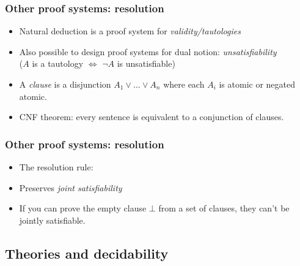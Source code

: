 \begin{frame}
  \frametitle{Other proof systems: resolution}

  \begin{itemize}
\item Natural deduction is a proof system for \emph{validity/tautologies}
\item Also possible to design proof systems for dual notion: \emph{unsatisfiability}\\
($A$ is a tautology $\Leftrightarrow$ $\lnot A$ is unsatisfiable)
\item A \emph{clause} is a disjunction $ A_1 \lor \ldots \lor A_n$
where each $ A_i$ is atomic or negated atomic.
\item CNF theorem: every sentence is equivalent to a conjunction of clauses.
\end{itemize}
\end{frame}

\begin{frame}
\frametitle{Other proof systems: resolution}

\begin{itemize}
\item The resolution rule:
\begin{fitchproof}
\end{fitchproof}
\item Preserves \emph{joint satisfiability}
\item If you can prove the empty clause $\bot$ from a set of clauses, they can't be
jointly satisfiable.
\end{itemize}
\end{frame}

\subsection{Theories and decidability}
